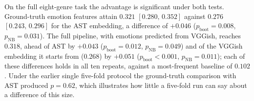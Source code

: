 On the full eight-genre task the advantage is significant under both tests. Ground-truth
emotion features attain $0.321$ $[0.280,\,0.352]$ against $0.276$ $[0.243,\,0.296]$ for
the AST embedding, a difference of $+0.046$ ($p_{\text{boot}}=0.008$,
$p_{\text{NB}}=0.031$). The full pipeline, with emotions predicted from VGGish, reaches
$0.318$, ahead of AST by $+0.043$ ($p_{\text{boot}}=0.012$, $p_{\text{NB}}=0.049$) and of
the VGGish embedding it starts from ($0.268$) by $+0.051$ ($p_{\text{boot}}<0.001$,
$p_{\text{NB}}=0.011$); each of these differences holds in all ten repeats, against a
most-frequent baseline of $0.102$. Under the earlier single five-fold protocol the
ground-truth comparison with AST produced $p=0.62$, which illustrates how little a
five-fold run can say about a difference of this size.
